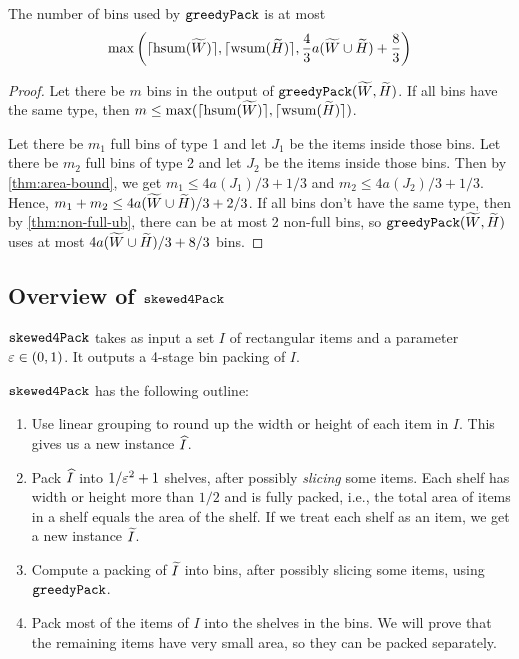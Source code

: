 \begin{theorem}
\label{thm:greedy-pack-bins}
The number of bins used by $\operatorname{\mathtt{greedyPack}}$ is at most
\[ \max\left(\lceil \operatorname{hsum}(\widetilde{W}) \rceil, \lceil \operatorname{wsum}(\widetilde{H}) \rceil,
    \frac{4}{3}a(\widetilde{W} \cup \widetilde{H}) + \frac{8}{3}\right) \]
\end{theorem}
\begin{proof}
Let there be $m$ bins in the output of $\operatorname{\mathtt{greedyPack}}(\widetilde{W}, \widetilde{H})$.
If all bins have the same type, then $m \le \max(\lceil \operatorname{hsum}(\widetilde{W}) \rceil, \lceil \operatorname{wsum}(\widetilde{H}) \rceil)$.

Let there be $m_1$ full bins of type 1 and let $J_1$ be the items inside those bins.
Let there be $m_2$ full bins of type 2 and let $J_2$ be the items inside those bins.
Then by \cref{thm:area-bound}, we get $m_1 \le 4a(J_1)/3 + 1/3$ and $m_2 \le 4a(J_2)/3 + 1/3$.
Hence, $m_1 + m_2 \le 4a(\widetilde{W} \cup \widetilde{H})/3 + 2/3$.
If all bins don't have the same type, then by \cref{thm:non-full-ub},
there can be at most 2 non-full bins, so $\operatorname{\mathtt{greedyPack}}(\widetilde{W}, \widetilde{H})$
uses at most $4a(\widetilde{W} \cup \widetilde{H})/3 + 8/3$ bins.
\end{proof}

\subsection{Overview of \texorpdfstring{$\operatorname{\mathtt{skewed4Pack}}$}{thin4Pack}}

$\operatorname{\mathtt{skewed4Pack}}$ takes as input a set $I$ of rectangular items
and a parameter $\varepsilon \in (0, 1)$.
It outputs a 4-stage bin packing of $I$.

$\operatorname{\mathtt{skewed4Pack}}$ has the following outline:
\begin{enumerate}
\item Use linear grouping to round up the width or height of each item in $I$.
    This gives us a new instance $\widehat{I}$.
\item Pack $\widehat{I}$ into $1/\varepsilon^2 + 1$ shelves,
    after possibly \emph{slicing} some items.
    Each shelf has width or height more than $1/2$ and is fully packed, i.e.,
    the total area of items in a shelf equals the area of the shelf.
    If we treat each shelf as an item, we get a new instance $\widetilde{I}$.
\item Compute a packing of $\widetilde{I}$ into bins, after possibly slicing some items,
    using $\operatorname{\mathtt{greedyPack}}$.
\item Pack most of the items of $I$ into the shelves in the bins. We will prove that
    the remaining items have very small area, so they can be packed separately.
\end{enumerate}

